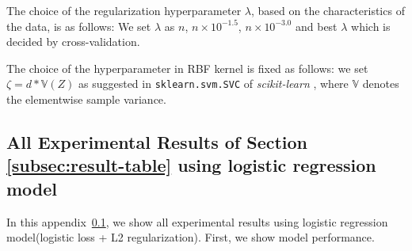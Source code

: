 The choice of the regularization hyperparameter $\lambda$, based on the characteristics of the data, is as follows:
We set $\lambda$ as $n$, $n\times 10^{-1.5}$, $n\times 10^{-3.0}$ and best $\lambda$ which is decided by cross-validation.

The choice of the hyperparameter in RBF kernel is fixed as follows: we set $\zeta = d * \mathbb{V}(Z)$ as suggested in {\tt sklearn.svm.SVC} of \emph{scikit-learn} \citep{scikit-learn}, where $\mathbb{V}$ denotes the elementwise sample variance.




\newpage
\subsection{All Experimental Results of Section \ref{subsec:result-table} using logistic regression model} \label{app:result-logistic}

In this appendix~\ref{app:result-logistic}, we show all experimental results using logistic regression model(logistic loss + L2 regularization). First, we show model performance.

